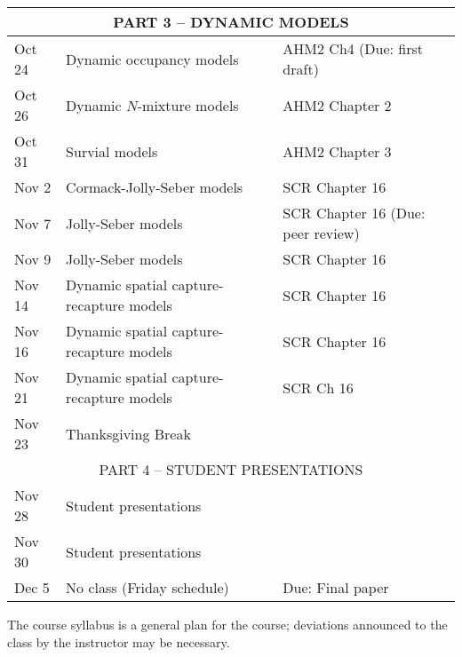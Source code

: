 \documentclass[12pt]{article}
\begin{document}
\begin{center}
\begin{tabular}[c]{lll}
           \multicolumn{3}{c}{PART 3 -- DYNAMIC MODELS}                                                          \\
\hline
Oct 24      & Dynamic occupancy models                     & AHM2 Ch4 (Due: first draft)                          \\
Oct 26      & Dynamic $N$-mixture models                   & AHM2 Chapter 2                                       \\
\hline
Oct 31     & Survial models                               & AHM2 Chapter 3                                       \\
Nov 2     & Cormack-Jolly-Seber models                   & SCR Chapter 16                                       \\
\hline
Nov 7     & Jolly-Seber models                           & SCR Chapter 16 (Due: peer review)                     \\
Nov 9    & Jolly-Seber models                           & SCR Chapter 16                                       \\
\hline
Nov 14     & Dynamic spatial capture-recapture models     & SCR Chapter 16                                       \\
Nov 16     & Dynamic spatial capture-recapture models     & SCR Chapter 16                                       \\
\hline
Nov 21     & Dynamic spatial capture-recapture models     & SCR Ch 16                          \\
Nov 23     & Thanksgiving Break                           &                                                      \\
\hline
           \multicolumn{3}{c}{PART 4 -- STUDENT PRESENTATIONS}                                                   \\
\hline
Nov 28     & Student presentations                        &                                                      \\
Nov 30      & Student presentations                        &                                                      \\
\hline
Dec 5      & No class (Friday schedule)                   & Due: Final paper                                     \\
\hline \hline
\end{tabular}
\end{center}

The course syllabus is a general plan for the course; deviations announced to the class by the instructor may be necessary.
\end{document}

